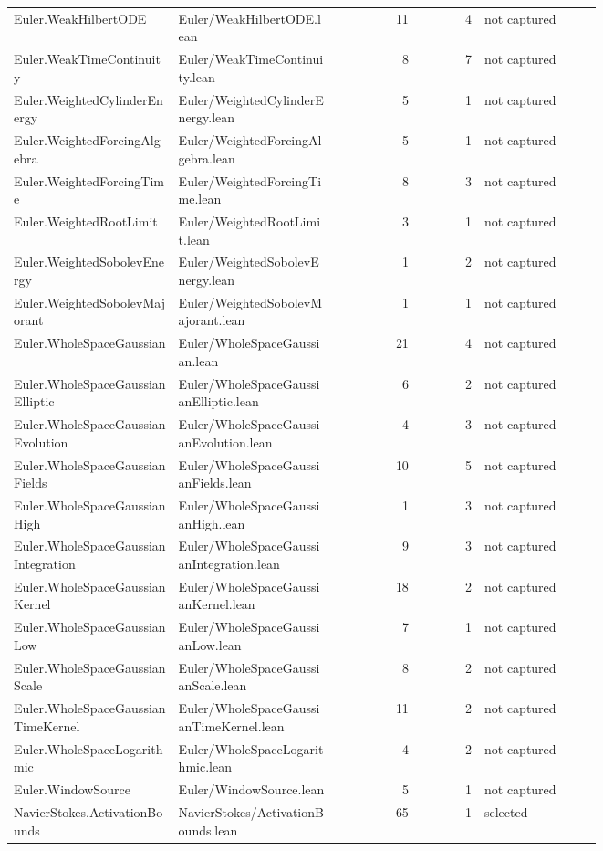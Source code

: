 \documentclass[10pt]{article}
\begin{document}
\begin{longtable}{p{0.28\linewidth}p{0.27\linewidth}r r p{0.20\linewidth}}
Euler.WeakHilbertODE & Euler/WeakHilbertODE.lean & 11 & 4 & not captured\\
Euler.WeakTimeContinuity & Euler/WeakTimeContinuity.lean & 8 & 7 & not captured\\
Euler.WeightedCylinderEnergy & Euler/WeightedCylinderEnergy.lean & 5 & 1 & not captured\\
Euler.WeightedForcingAlgebra & Euler/WeightedForcingAlgebra.lean & 5 & 1 & not captured\\
Euler.WeightedForcingTime & Euler/WeightedForcingTime.lean & 8 & 3 & not captured\\
Euler.WeightedRootLimit & Euler/WeightedRootLimit.lean & 3 & 1 & not captured\\
Euler.WeightedSobolevEnergy & Euler/WeightedSobolevEnergy.lean & 1 & 2 & not captured\\
Euler.WeightedSobolevMajorant & Euler/WeightedSobolevMajorant.lean & 1 & 1 & not captured\\
Euler.WholeSpaceGaussian & Euler/WholeSpaceGaussian.lean & 21 & 4 & not captured\\
Euler.WholeSpaceGaussianElliptic & Euler/WholeSpaceGaussianElliptic.lean & 6 & 2 & not captured\\
Euler.WholeSpaceGaussianEvolution & Euler/WholeSpaceGaussianEvolution.lean & 4 & 3 & not captured\\
Euler.WholeSpaceGaussianFields & Euler/WholeSpaceGaussianFields.lean & 10 & 5 & not captured\\
Euler.WholeSpaceGaussianHigh & Euler/WholeSpaceGaussianHigh.lean & 1 & 3 & not captured\\
Euler.WholeSpaceGaussianIntegration & Euler/WholeSpaceGaussianIntegration.lean & 9 & 3 & not captured\\
Euler.WholeSpaceGaussianKernel & Euler/WholeSpaceGaussianKernel.lean & 18 & 2 & not captured\\
Euler.WholeSpaceGaussianLow & Euler/WholeSpaceGaussianLow.lean & 7 & 1 & not captured\\
Euler.WholeSpaceGaussianScale & Euler/WholeSpaceGaussianScale.lean & 8 & 2 & not captured\\
Euler.WholeSpaceGaussianTimeKernel & Euler/WholeSpaceGaussianTimeKernel.lean & 11 & 2 & not captured\\
Euler.WholeSpaceLogarithmic & Euler/WholeSpaceLogarithmic.lean & 4 & 2 & not captured\\
Euler.WindowSource & Euler/WindowSource.lean & 5 & 1 & not captured\\
NavierStokes.ActivationBounds & NavierStokes/ActivationBounds.lean & 65 & 1 & selected\\

\end{longtable}
\end{document}
